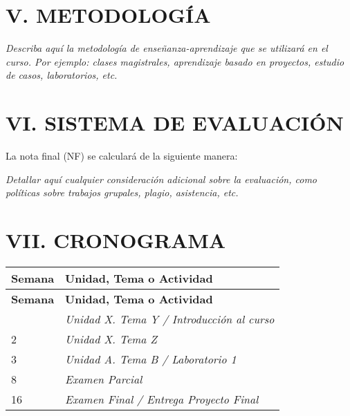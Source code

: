 \documentclass[12pt,a4paper]{article}
\begin{document}
\vspace{0.5cm}

\section*{V. METODOLOGÍA}
\textit{Describa aquí la metodología de enseñanza-aprendizaje que se utilizará en el curso. Por ejemplo: clases magistrales, aprendizaje basado en proyectos, estudio de casos, laboratorios, etc.}
\vspace{0.5cm}

\section*{VI. SISTEMA DE EVALUACIÓN}
La nota final (NF) se calculará de la siguiente manera:


\textit{Detallar aquí cualquier consideración adicional sobre la evaluación, como políticas sobre trabajos grupales, plagio, asistencia, etc.}
\vspace{0.5cm}

\section*{VII. CRONOGRAMA} %
\begin{longtable}{p{2cm} p{12cm}}
    \toprule
    \textbf{Semana} & \textbf{Unidad, Tema o Actividad} \\
    \midrule
    \endfirsthead
    \toprule
    \textbf{Semana} & \textbf{Unidad, Tema o Actividad} \\
    \midrule
    \endhead
    \bottomrule
    \endfoot
    1 & \textit{Unidad X. Tema Y / Introducción al curso} \\
    2 & \textit{Unidad X. Tema Z} \\
    3 & \textit{Unidad A. Tema B / Laboratorio 1} \\
    8 & \textit{Examen Parcial} \\
    16 & \textit{Examen Final / Entrega Proyecto Final} \\
\end{longtable}
\vspace{0.5cm}
\end{document}
